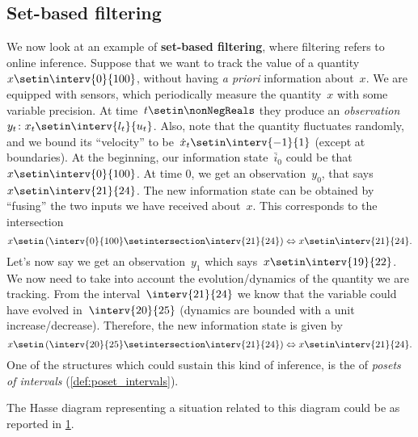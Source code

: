 \subsection{Set-based filtering}
We now look at an example of \textbf{set-based filtering}, where filtering refers to online inference.
Suppose that we want to track the value of a quantity~$x\setin \interv{0}{100}$, without having \emph{a priori} information about~$x$.
We are equipped with sensors, which periodically measure the quantity~$x$ with some variable precision.
At time~$t\setin \nonNegReals$ they produce an \emph{observation}~$y_t\colon x_t\setin \interv{l_t}{u_t}$.
Also, note that the quantity fluctuates randomly, and we bound its ``velocity'' to be~$\dot{x}_t\setin \interv{-1}{1}$ (except at boundaries).
At the beginning, our information state~$\bar{i}_0$ could be that~$x\setin \interv{0}{100}$.
At time 0, we get an observation~$y_0$, that says~$x\setin \interv{21}{24}$.
The new information state can be obtained by ``fusing'' the two inputs we have received about~$x$.
This corresponds to the intersection
\begin{equation*}
    x\setin \left( \interv{0}{100} \setintersection \interv{21}{24}\right)\Leftrightarrow x\setin \interv{21}{24}.
\end{equation*}
Let's now say we get an observation~$y_1$ which says~$x\setin \interv{19}{22}$.
We now need to take into account the evolution/dynamics of the quantity we are tracking.
From the interval~$\interv{21}{24}$ we know that the variable could have evolved in~$\interv{20}{25}$ (dynamics are bounded with a unit increase/decrease).
Therefore, the new information state is given by
\begin{equation*}
    x\setin \left( \interv{20}{25} \setintersection \interv{21}{24}\right)\Leftrightarrow x\setin \interv{21}{24}.
\end{equation*}
One of the structures which could sustain this kind of inference, is the of \emph{posets of intervals} (\cref{def:poset_intervals}).

The Hasse diagram representing a situation related to this diagram could be as reported in \cref{fig:hasse_filtering}.
\begin{figure}[h!]
    \centering
    \caption{}
    \label{fig:hasse_filtering}
\end{figure}
